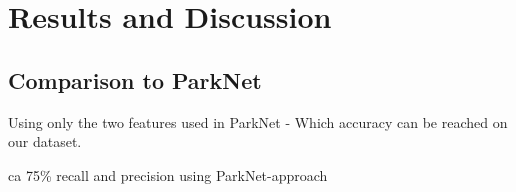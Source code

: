 \chapter{Results and Discussion}
\label{chap:evaluation}

\section{Comparison to ParkNet}

Using only the two features used in ParkNet - Which accuracy can be reached on our dataset.

ca 75\% recall and precision using ParkNet-approach